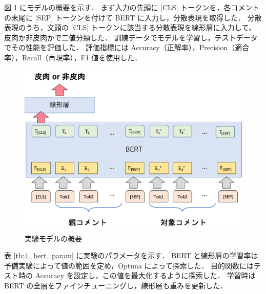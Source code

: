 \par
図 \ref{fig:40_model} にモデルの概要を示す．
まず入力の先頭に [CLS] トークンを，各コメントの末尾に [SEP] トークンを付けて BERT に入力し，分散表現を取得した．
分散表現のうち，文頭の [CLS] トークンに該当する分散表現を線形層に入力して，皮肉か非皮肉かで二値分類した．
訓練データでモデルを学習し，テストデータでその性能を評価した．
評価指標には Accuracy（正解率），Precision（適合率），Recall（再現率），F1 値を使用した．

 \begin{figure}[tb]
 	\begin{center}
	 \includegraphics[width=0.8\linewidth]{./figure/40_model.png}
	 \end{center}
 \caption{実験モデルの概要}
 \label{fig:40_model}
 \end{figure}


表 \ref{tb:4_bert_param} に実験のパラメータを示す．
BERT と線形層の学習率は予備実験によって値の範囲を定め，Optuna によって探索した．
目的関数にはテスト時の Accuracy を設定し，この値を最大化するように探索した．
学習時は BERT の全層をファインチューニングし，線形層も重みを更新した．
\par

